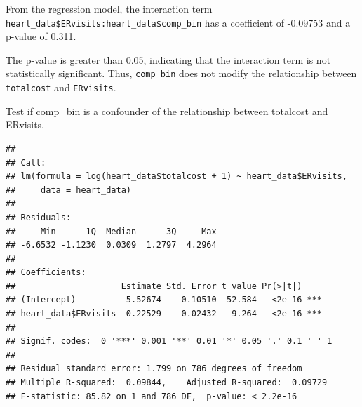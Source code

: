 \documentclass[
]{article}
\newenvironment{Shaded}{\begin{snugshade}}{\end{snugshade}}
\newcommand{\AttributeTok}[1]{\textcolor[rgb]{0.13,0.29,0.53}{#1}}
\newcommand{\CommentTok}[1]{\textcolor[rgb]{0.56,0.35,0.01}{\textit{#1}}}
\newcommand{\DecValTok}[1]{\textcolor[rgb]{0.00,0.00,0.81}{#1}}
\newcommand{\FunctionTok}[1]{\textcolor[rgb]{0.13,0.29,0.53}{\textbf{#1}}}
\newcommand{\NormalTok}[1]{#1}
\newcommand{\OtherTok}[1]{\textcolor[rgb]{0.56,0.35,0.01}{#1}}
\newcommand{\SpecialCharTok}[1]{\textcolor[rgb]{0.81,0.36,0.00}{\textbf{#1}}}
\begin{document}
From the regression model, the interaction term
\texttt{heart\_data\$ERvisits:heart\_data\$comp\_bin} has a coefficient
of -0.09753 and a p-value of 0.311.

The p-value is greater than 0.05, indicating that the interaction term
is not statistically significant. Thus, \texttt{comp\_bin} does not
modify the relationship between \texttt{totalcost} and
\texttt{ERvisits}.

Test if comp\_bin is a confounder of the relationship between totalcost
and ERvisits.

\begin{Shaded}
\end{Shaded}

\begin{verbatim}
## 
## Call:
## lm(formula = log(heart_data$totalcost + 1) ~ heart_data$ERvisits, 
##     data = heart_data)
## 
## Residuals:
##     Min      1Q  Median      3Q     Max 
## -6.6532 -1.1230  0.0309  1.2797  4.2964 
## 
## Coefficients:
##                     Estimate Std. Error t value Pr(>|t|)    
## (Intercept)          5.52674    0.10510  52.584   <2e-16 ***
## heart_data$ERvisits  0.22529    0.02432   9.264   <2e-16 ***
## ---
## Signif. codes:  0 '***' 0.001 '**' 0.01 '*' 0.05 '.' 0.1 ' ' 1
## 
## Residual standard error: 1.799 on 786 degrees of freedom
## Multiple R-squared:  0.09844,    Adjusted R-squared:  0.09729 
## F-statistic: 85.82 on 1 and 786 DF,  p-value: < 2.2e-16
\end{verbatim}
\end{document}
